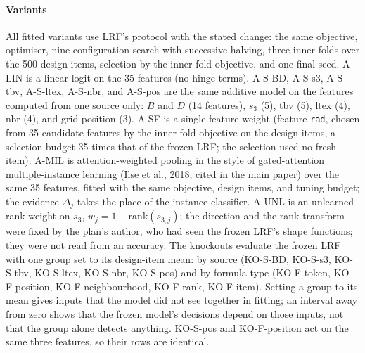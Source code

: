 \documentclass[journal,onecolumn]{IEEEtran}
\theoremstyle{plain}
\begin{document}
\paragraph*{Variants}
All fitted variants use LRF's protocol with the stated change: the same objective, optimiser, nine-configuration search with successive
halving, three inner folds over the 500 design items, selection by the inner-fold objective, and one final seed.
A-LIN is a linear logit on the 35 features (no hinge terms).
A-S-BD, A-S-s3, A-S-tbv, A-S-ltex, A-S-nbr, and A-S-pos are the same additive model on the features computed from one source only: $B$ and
$D$ (14 features), $s_3$ (5), tbv (5), ltex (4), nbr (4), and grid position (3).
A-SF is a single-feature weight (feature \texttt{rad}, chosen from 35 candidate features by the inner-fold objective on the design items,
a selection budget 35 times that of the frozen LRF; the selection used no fresh item).
A-MIL is attention-weighted pooling in the style of gated-attention multiple-instance learning (Ilse et al., 2018; cited in the main paper) over the same 35 features, fitted with the
same objective, design items, and tuning budget; the evidence $\Delta_j$ takes the place of the instance classifier.
A-UNL is an unlearned rank weight on $s_3$, $w_j=1-\mathrm{rank}(s_{3,j})$; the direction and the rank transform were fixed by the plan's
author, who had seen the frozen LRF's shape functions; they were not read from an accuracy.
The knockouts evaluate the frozen LRF with one group set to its design-item mean: by source (KO-S-BD, KO-S-s3, KO-S-tbv, KO-S-ltex,
KO-S-nbr, KO-S-pos) and by formula type (KO-F-token, KO-F-position, KO-F-neighbourhood, KO-F-rank, KO-F-item).
Setting a group to its mean gives inputs that the model did not see together in fitting; an interval away from zero shows that the frozen
model's decisions depend on those inputs, not that the group alone detects anything.
KO-S-pos and KO-F-position act on the same three features, so their rows are identical.
\end{document}
